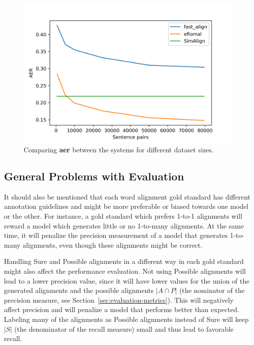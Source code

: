 \begin{figure}
\centering
\includegraphics{graphics/charts/aer.png}
\caption{Comparing \textbf{\acrshort{aer}} between the systems for different dataset sizes.}
\label{fig:aer}
\end{figure}

\subsection{General Problems with Evaluation}
\label{sec:problems-evaluation}
It should also be mentioned that each word alignment gold standard has different annotation guidelines and might be more preferable or biased towards one model or the other. 
For instance, a gold standard which prefers 1-to-1 alignments will reward a model which generates little or no 1-to-many alignments. 
At the same time, it will penalize the precision measurement of a model that generates 1-to-many alignments, even though these alignments might be correct.

Handling Sure and Possible alignments in a different way in each gold standard might also affect the performance evaluation. 
Not using Possible alignments will lead to a lower precision value, since it will have lower values for the union of the generated alignments and the possible alignments $|A \cap P|$ (the nominator of the precision measure, see Section~\ref{sec:evaluation-metrics}). This will negatively affect precision and will penalize a model that performs better than expected. 
Labeling many of the alignments as Possible alignments instead of Sure will keep $|S|$ (the denominator of the recall measure) small and thus lead to favorable recall. 


